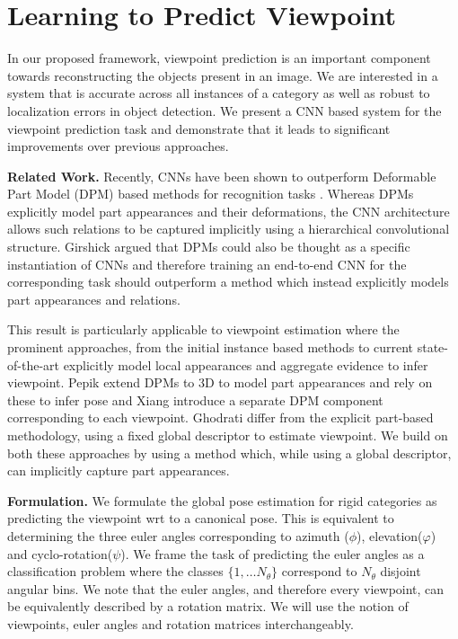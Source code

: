 \section{Learning to Predict Viewpoint}

In our proposed framework, viewpoint prediction is an important component towards reconstructing the objects present in an image. We are interested in a system that is accurate across all instances of a category as well as robust to localization errors in object detection. We present a CNN based system for the viewpoint prediction task and demonstrate  that it leads to significant improvements over previous approaches.

\vspace{3mm}
\noindent \textbf{Related Work.}
Recently, CNNs have been shown to outperform Deformable Part Model (DPM) \cite{felzens_latent_pami10} based methods for recognition tasks \cite{rcnn,Krizhevsky}. Whereas DPMs explicitly model part appearances and their deformations, the CNN architecture allows such relations to be captured implicitly using a hierarchical convolutional structure.  Girshick \etal \cite{DPMsCNNs} argued that DPMs could also be thought as a specific instantiation of CNNs and therefore training an end-to-end CNN for the corresponding task should outperform a method which instead explicitly models part appearances and relations.

This result is particularly applicable to viewpoint estimation where the prominent approaches, from the initial instance based methods \cite{huttenlocher1990recognizing} to current state-of-the-art  \cite{pascal3d,pepik12dpm} explicitly model local appearances and aggregate evidence to infer viewpoint. Pepik \etal \cite{pepik12dpm} extend DPMs to 3D to model part appearances and rely on these to infer pose and Xiang \etal \cite{pascal3d} introduce a separate DPM component corresponding to each viewpoint. Ghodrati \etal \cite{ghodrati14viewpoint} differ from the explicit part-based methodology, using a fixed global descriptor to estimate viewpoint. We build on both these approaches by using a method which, while using a global descriptor, can implicitly capture part appearances.

\vspace{3mm}
\noindent \textbf{Formulation.}
We formulate the global pose estimation for rigid categories as predicting the viewpoint wrt to a canonical pose. This is equivalent to determining the three euler angles corresponding to azimuth ($\phi$), elevation($\varphi$) and cyclo-rotation($\psi$). We frame the task of predicting the euler angles as a classification problem where the classes $\{1,\ldots N_{\theta}\}$ correspond to $N_{\theta}$ disjoint angular bins. We note that the euler angles, and therefore every viewpoint, can be equivalently described by a rotation matrix. We will use the notion of viewpoints, euler angles and rotation matrices interchangeably.

